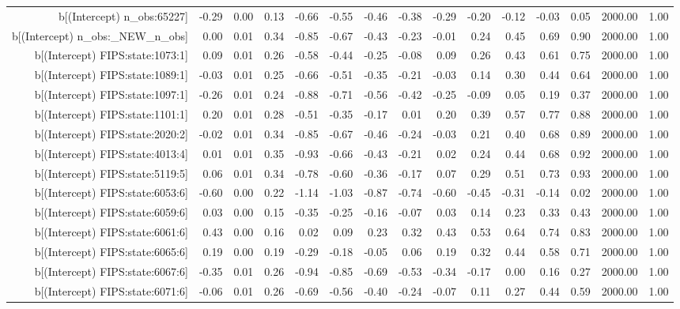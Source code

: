 \begin{table}[ht]
\begin{tabular}{rrrrrrrrrrrrrrr}
  b[(Intercept) n\_obs:65227] & -0.29 & 0.00 & 0.13 & -0.66 & -0.55 & -0.46 & -0.38 & -0.29 & -0.20 & -0.12 & -0.03 & 0.05 & 2000.00 & 1.00 \\ 
  b[(Intercept) n\_obs:\_NEW\_n\_obs] & 0.00 & 0.01 & 0.34 & -0.85 & -0.67 & -0.43 & -0.23 & -0.01 & 0.24 & 0.45 & 0.69 & 0.90 & 2000.00 & 1.00 \\ 
  b[(Intercept) FIPS:state:1073:1] & 0.09 & 0.01 & 0.26 & -0.58 & -0.44 & -0.25 & -0.08 & 0.09 & 0.26 & 0.43 & 0.61 & 0.75 & 2000.00 & 1.00 \\ 
  b[(Intercept) FIPS:state:1089:1] & -0.03 & 0.01 & 0.25 & -0.66 & -0.51 & -0.35 & -0.21 & -0.03 & 0.14 & 0.30 & 0.44 & 0.64 & 2000.00 & 1.00 \\ 
  b[(Intercept) FIPS:state:1097:1] & -0.26 & 0.01 & 0.24 & -0.88 & -0.71 & -0.56 & -0.42 & -0.25 & -0.09 & 0.05 & 0.19 & 0.37 & 2000.00 & 1.00 \\ 
  b[(Intercept) FIPS:state:1101:1] & 0.20 & 0.01 & 0.28 & -0.51 & -0.35 & -0.17 & 0.01 & 0.20 & 0.39 & 0.57 & 0.77 & 0.88 & 2000.00 & 1.00 \\ 
  b[(Intercept) FIPS:state:2020:2] & -0.02 & 0.01 & 0.34 & -0.85 & -0.67 & -0.46 & -0.24 & -0.03 & 0.21 & 0.40 & 0.68 & 0.89 & 2000.00 & 1.00 \\ 
  b[(Intercept) FIPS:state:4013:4] & 0.01 & 0.01 & 0.35 & -0.93 & -0.66 & -0.43 & -0.21 & 0.02 & 0.24 & 0.44 & 0.68 & 0.92 & 2000.00 & 1.00 \\ 
  b[(Intercept) FIPS:state:5119:5] & 0.06 & 0.01 & 0.34 & -0.78 & -0.60 & -0.36 & -0.17 & 0.07 & 0.29 & 0.51 & 0.73 & 0.93 & 2000.00 & 1.00 \\ 
  b[(Intercept) FIPS:state:6053:6] & -0.60 & 0.00 & 0.22 & -1.14 & -1.03 & -0.87 & -0.74 & -0.60 & -0.45 & -0.31 & -0.14 & 0.02 & 2000.00 & 1.00 \\ 
  b[(Intercept) FIPS:state:6059:6] & 0.03 & 0.00 & 0.15 & -0.35 & -0.25 & -0.16 & -0.07 & 0.03 & 0.14 & 0.23 & 0.33 & 0.43 & 2000.00 & 1.00 \\ 
  b[(Intercept) FIPS:state:6061:6] & 0.43 & 0.00 & 0.16 & 0.02 & 0.09 & 0.23 & 0.32 & 0.43 & 0.53 & 0.64 & 0.74 & 0.83 & 2000.00 & 1.00 \\ 
  b[(Intercept) FIPS:state:6065:6] & 0.19 & 0.00 & 0.19 & -0.29 & -0.18 & -0.05 & 0.06 & 0.19 & 0.32 & 0.44 & 0.58 & 0.71 & 2000.00 & 1.00 \\ 
  b[(Intercept) FIPS:state:6067:6] & -0.35 & 0.01 & 0.26 & -0.94 & -0.85 & -0.69 & -0.53 & -0.34 & -0.17 & 0.00 & 0.16 & 0.27 & 2000.00 & 1.00 \\ 
  b[(Intercept) FIPS:state:6071:6] & -0.06 & 0.01 & 0.26 & -0.69 & -0.56 & -0.40 & -0.24 & -0.07 & 0.11 & 0.27 & 0.44 & 0.59 & 2000.00 & 1.00 \\ 

\end{tabular}
\end{table}
